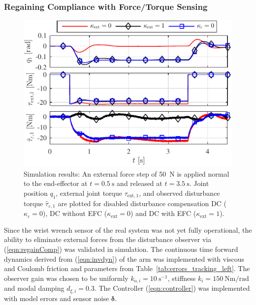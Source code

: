 \subsubsection{Regaining Compliance with Force/Torque Sensing}
\label{sec:comp_obs_regain}
\begin{figure}
\centering
\parbox{\columnwidth}{
\includegraphics[width=\linewidth]{simulations/SimExp_ObsExtForce.pdf}
}
\vspace*{-1ex}
\caption{Simulation results: An external force step of 50~N is applied normal to the end-effector at $t=0.5~\mathrm{s}$ and released at $t=3.5~\mathrm{s}$.
Joint position $q_1$, external joint torque $\tau_{\mathrm{ext,1}}$, and observed disturbance torque $\hat{\tau}_{\varepsilon,1}$ are plotted for disabled disturbance compensation DC ($\kappa_\varepsilon=0$), DC without EFC ($\kappa_\mathrm{ext}=0$) and DC with EFC ($\kappa_\mathrm{ext}=1$).}
\label{fig:DistTorque}
\SkipBeforeText
\end{figure}
%
Since the wrist wrench sensor of the real system was not yet fully operational, the ability to eliminate external forces from the disturbance observer via (\ref{eqn:regainComp}) was validated in simulation.
The continuous time forward dynamics derived from (\ref{eqn:invdyn}) of the arm was implemented with viscous and Coulomb friction and parameters from Table~\ref{tab:errors_tracking_left}.
The observer gain was chosen to be uniformly $k_{\mathrm{o},i}=10~\mathrm{s}^{-1}$, stiffness $k_i=150~\mathrm{Nm/rad}$ and modal damping $d_{\xi,i}=0.3$.
The Controller (\ref{eqn:controller}) was implemented with model errors and sensor noise $\bm{\delta}$.
